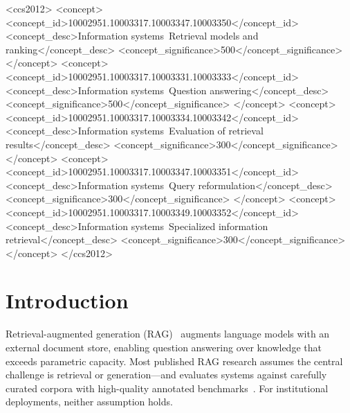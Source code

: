 \documentclass[sigconf,natbib=true]{acmart}
\begin{document}
\begin{CCSXML}
<ccs2012>
 <concept>
  <concept_id>10002951.10003317.10003347.10003350</concept_id>
  <concept_desc>Information systems~Retrieval models and ranking</concept_desc>
  <concept_significance>500</concept_significance>
 </concept>
 <concept>
  <concept_id>10002951.10003317.10003331.10003333</concept_id>
  <concept_desc>Information systems~Question answering</concept_desc>
  <concept_significance>500</concept_significance>
 </concept>
 <concept>
  <concept_id>10002951.10003317.10003334.10003342</concept_id>
  <concept_desc>Information systems~Evaluation of retrieval results</concept_desc>
  <concept_significance>300</concept_significance>
 </concept>
 <concept>
  <concept_id>10002951.10003317.10003347.10003351</concept_id>
  <concept_desc>Information systems~Query reformulation</concept_desc>
  <concept_significance>300</concept_significance>
 </concept>
 <concept>
  <concept_id>10002951.10003317.10003349.10003352</concept_id>
  <concept_desc>Information systems~Specialized information retrieval</concept_desc>
  <concept_significance>300</concept_significance>
 </concept>
</ccs2012>
\end{CCSXML}



\maketitle

\section{Introduction}
\label{sec:intro}

Retrieval-augmented generation (RAG)~\cite{lewis2020rag,gao2023rag_survey} augments language models with an external document store, enabling question answering over knowledge that exceeds parametric capacity.
Most published RAG research assumes the central challenge is retrieval or generation---and evaluates systems against carefully curated corpora with high-quality annotated benchmarks~\cite{es2023ragas,yu2024ragsurvey}.
For institutional deployments, neither assumption holds.
\end{document}
